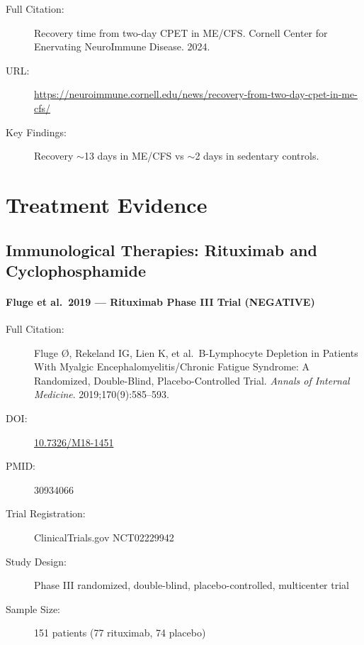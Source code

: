 \begin{description}
    \item[Full Citation:] Recovery time from two-day CPET in ME/CFS. Cornell Center for Enervating NeuroImmune Disease. 2024.
    \item[URL:] \url{https://neuroimmune.cornell.edu/news/recovery-from-two-day-cpet-in-me-cfs/}
    \item[Key Findings:] Recovery $\sim$13 days in ME/CFS vs $\sim$2 days in sedentary controls.
\end{description}

\section{Treatment Evidence}
\label{sec:bib-treatment}

\subsection{Immunological Therapies: Rituximab and Cyclophosphamide}

\paragraph{Fluge et al.\ 2019 --- Rituximab Phase III Trial (NEGATIVE)}

\begin{description}
    \item[Full Citation:] Fluge Ø, Rekeland IG, Lien K, et al.\ B-Lymphocyte Depletion in Patients With Myalgic Encephalomyelitis/Chronic Fatigue Syndrome: A Randomized, Double-Blind, Placebo-Controlled Trial. \textit{Annals of Internal Medicine}. 2019;170(9):585--593.
    \item[DOI:] \href{https://doi.org/10.7326/M18-1451}{10.7326/M18-1451}
    \item[PMID:] 30934066
    \item[Trial Registration:] ClinicalTrials.gov NCT02229942
    \item[Study Design:] Phase III randomized, double-blind, placebo-controlled, multicenter trial
    \item[Sample Size:] 151 patients (77 rituximab, 74 placebo)
\end{description}


